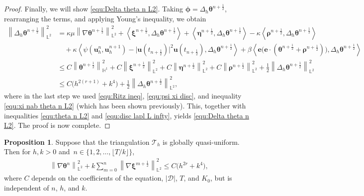\documentclass[11pt, reqno]{amsart}
\theoremstyle{definition}
\newtheorem{proposition}[theorem]{Proposition}
\theoremstyle{remark}
\numberwithin{equation}{section}
\newcommand{\bff}{\boldsymbol}
\newcommand{\bb}{\mathbb}
\newcommand{\norm}[2]{\left\|{#1}\right\|_{#2}}
\newcommand{\inpro}[2]{\left\langle#1,#2\right\rangle}
\begin{document}
\begin{proof}
Finally, we will show \eqref{equ:Delta theta n L2}. Taking $\bff{\phi}=\Delta_h \bff{\theta}^{n+\frac{1}{2}}$, rearranging the terms, and applying Young's inequality, we obtain
\begin{align*}
	\norm{\Delta_h \bff{\theta}^{n+\frac{1}{2}}}{\bb{L}^2}^2
	&=
	\kappa\mu \norm{\nabla \bff{\theta}^{n+\frac{1}{2}}}{\bb{L}^2}^2
	+
	\inpro{\bff{\xi}^{n+\frac{1}{2}}}{\Delta_h \bff{\theta}^{n+\frac{1}{2}}}
	+
	\inpro{\bff{\eta}^{n+\frac{1}{2}}}{\Delta_h \bff{\theta}^{n+\frac{1}{2}}}
	-
	\kappa \inpro{\bff{\rho}^{n+\frac{1}{2}}}{\Delta_h \bff{\theta}^{n+\frac{1}{2}}}
	\\
	&\quad
	+
	\kappa \inpro{\psi(\bff{u}_h^n,\bff{u}_h^{n+1})- \big|\bff{u}(t_{n+\frac12})\big|^2 \bff{u}(t_{n+\frac12})}{\Delta_h \bff{\theta}^{n+\frac12}}
	+
	\beta \inpro{\bff{e}\big(\bff{e}\cdot (\bff{\theta}^{n+\frac12}+\bff{\rho}^{n+\frac12})\big)}{\Delta_h \bff{\theta}^{n+\frac12}}
	\\
	&\leq
	C \norm{\bff{\theta}^{n+\frac{1}{2}}}{\bb{H}^1}^2
	+
	C\norm{\bff{\xi}^{n+\frac{1}{2}}}{\bb{L}^2}^2
	+
	C\norm{\bff{\eta}^{n+\frac{1}{2}}}{\bb{L}^2}^2
	+
	C\norm{\bff{\rho}^{n+\frac{1}{2}}}{\bb{L}^2}^2
	+
	\frac{1}{2} \norm{\Delta_h \bff{\theta}^{n+\frac{1}{2}}}{\bb{L}^2}^2
	\\
	&\leq
	C \big(h^{2(r+1)}+ k^4\big) +\frac{1}{2} \norm{\Delta_h \bff{\theta}^{n+\frac{1}{2}}}{\bb{L}^2}^2,
\end{align*}
where in the last step we used \eqref{equ:Ritz ineq}, \eqref{equ:psi xi disc}, and inequality \eqref{equ:xi nab theta n L2} (which has been shown previously).
This, together with inequalities \eqref{equ:theta n L2} and \eqref{equ:disc lapl L infty}, yields \eqref{equ:Delta theta n L2}. The proof is now complete.
\end{proof}

\begin{proposition}\label{pro:nab theta n xi n}
Suppose that the triangulation $\mathcal{T}_h$ is globally quasi-uniform. Then for $h, k>0$ and~$n\in \{1,2,\ldots,\lfloor T/k \rfloor\}$,
\begin{align*}
	\norm{\nabla \bff{\theta}^n}{\bb{L}^2}^2
	+
	k \sum_{m=0}^n \norm{\nabla \bff{\xi}^{m+\frac{1}{2}}}{\bb{L}^2}^2
	\leq
	C \big(h^{2r}+k^4 \big),
\end{align*}
where $C$ depends on the coefficients of the equation, $|\mathscr{D}|$, $T$, and $K_0$, but is independent of $n$, $h$, and $k$.
\end{proposition}
\end{document}
